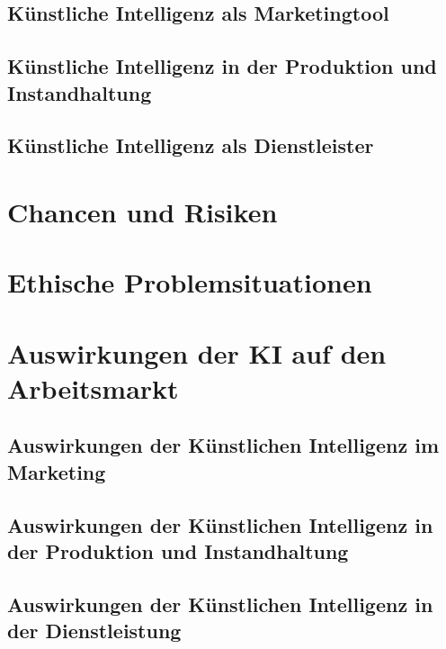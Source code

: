 \subsection{Künstliche Intelligenz als Marketingtool}



\subsection{Künstliche Intelligenz in der Produktion und Instandhaltung}



\subsection{Künstliche Intelligenz als Dienstleister}


\section{Chancen und Risiken}


\section{Ethische Problemsituationen}


\section{Auswirkungen der KI auf den Arbeitsmarkt}

\subsection{Auswirkungen der Künstlichen Intelligenz im Marketing}

\subsection{Auswirkungen der Künstlichen Intelligenz in der Produktion und Instandhaltung}

\subsection{Auswirkungen der Künstlichen Intelligenz in der Dienstleistung}


